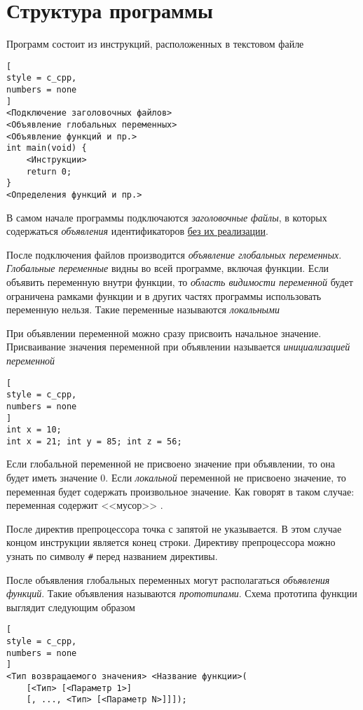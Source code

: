 \documentclass[%
	11pt,
	a4paper,
	utf8,
		]{article}
\begin{document}
\section{Структура программы}

Программ состоит из инструкций, расположенных в текстовом файле
\begin{lstlisting}[
style = c_cpp,
numbers = none
]
<Подключение заголовочных файлов>
<Объявление глобальных переменных>
<Объявление функций и пр.>
int main(void) {
    <Инструкции>
    return 0;
}
<Определения функций и пр.>
\end{lstlisting}

В самом начале программы подключаются \emph{заголовочные файлы}, в которых содержаться \emph{объявления} идентификаторов \underline{без их реализации}.

После подключения файлов производится \emph{объявление глобальных переменных}. \emph{Глобальные переменные} видны во всей программе, включая функции. Если объявить переменную внутри функции, то \emph{область видимости переменной} будет ограничена рамками функции и в других частях программы использовать переменную нельзя. Такие переменные называются \emph{локальными}

При объявлении переменной можно сразу присвоить начальное значение. Присваивание значения переменной при объявлении называется \emph{инициализацией переменной}
\begin{lstlisting}[
style = c_cpp,
numbers = none
]
int x = 10;
int x = 21; int y = 85; int z = 56;
\end{lstlisting}

Если глобальной переменной не присвоено значение при объявлении, то она будет иметь значение 0. Если \emph{локальной} переменной не присвоено значение, то переменная будет содержать {\color{red}произвольное значение}. Как говорят в таком случае: переменная содержит <<мусор>> \cite[]{prokhorenok-prog-c:2020}.

После директив препроцессора точка с запятой не указывается. В этом случае концом инструкции является конец строки. Директиву препроцессора можно узнать по символу \verb|#| перед названием директивы. 

После объявления глобальных переменных могут располагаться \emph{объявления функций}. Такие объявления называются \emph{прототипами}. Схема прототипа функции выглядит следующим образом
\begin{lstlisting}[
style = c_cpp,
numbers = none
]
<Тип возвращаемого значения> <Название функции>(
    [<Тип> [<Параметр 1>]
    [, ..., <Тип> [<Параметр N>]]]);
\end{lstlisting}
\end{document}
